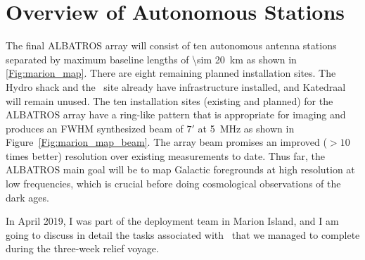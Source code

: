 \section{Overview of Autonomous Stations}\label{s:autonomous}

The final ALBATROS array will consist of ten autonomous antenna stations separated by maximum baseline lengths of \SI{\sim 20}{\kilo \meter} as shown in \autoref{Fig:marion_map}. There are eight remaining planned installation sites. The Hydro shack and the \prizm\ site already have infrastructure installed, and Katedraal will remain unused. The ten installation sites (existing and planned) for the ALBATROS array have a ring-like pattern that is appropriate for imaging and produces an FWHM synthesized beam of $7'$ at \SI{5}{\mega\hertz} as shown in Figure~\ref{Fig:marion_map_beam}. The array beam promises an improved ($>10$ times better) resolution over existing measurements to date. Thus far, the ALBATROS main goal will be to map Galactic foregrounds at high resolution at low frequencies, which is crucial before doing cosmological observations of the dark ages. 

In April 2019, I was part of the deployment team in Marion Island, and I am going to discuss in detail the tasks associated with \albatros\ that we managed to complete during the three-week relief voyage.  

